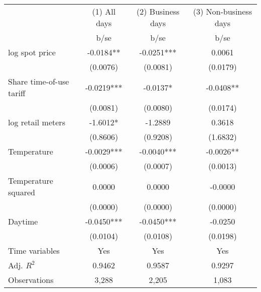 \begin{tabular}{lccc}\toprule
                    &(1) All days   &(2) Business days   &(3) Non-business days   \\
                    &        b/se   &        b/se   &        b/se   \\
\midrule
log spot price      &     -0.0184** &     -0.0251***&      0.0061   \\
                    &    (0.0076)   &    (0.0081)   &    (0.0179)   \\
Share time-of-use tariff&     -0.0219***&     -0.0137*  &     -0.0408** \\
                    &    (0.0081)   &    (0.0080)   &    (0.0174)   \\
log retail meters   &     -1.6012*  &     -1.2889   &      0.3618   \\
                    &    (0.8606)   &    (0.9208)   &    (1.6832)   \\
Temperature         &     -0.0029***&     -0.0040***&     -0.0026** \\
                    &    (0.0006)   &    (0.0007)   &    (0.0013)   \\
Temperature squared &      0.0000   &      0.0000   &     -0.0000   \\
                    &    (0.0000)   &    (0.0000)   &    (0.0000)   \\
Daytime             &     -0.0450***&     -0.0450***&     -0.0250   \\
                    &    (0.0104)   &    (0.0108)   &    (0.0198)   \\
Time variables      &         Yes   &         Yes   &         Yes   \\
\midrule
Adj. \(R^2\)        &      0.9462   &      0.9587   &      0.9297   \\
Observations        &       3,288   &       2,205   &       1,083   \\
\bottomrule\end{tabular}
